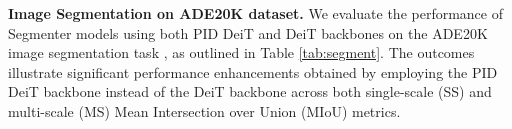 \textbf{Image Segmentation on ADE20K dataset.}
We evaluate the performance of Segmenter models \cite{strudel2021segmenter} using both PID DeiT and DeiT backbones on the ADE20K image segmentation task \cite{zhou2017scene}, as outlined in Table \ref{tab:segment}. The outcomes illustrate significant performance enhancements obtained by employing the PID DeiT backbone instead of the DeiT backbone across both single-scale (SS) and multi-scale (MS) Mean Intersection over Union (MIoU) metrics. 
\begin{table}[t!]
\vspace{-5mm}
\centering
\caption{\small 
\small 
Single-scale (SS) MIoU and multi-scale MIoU (MS) of the PID DeiT vs. the DeiT on the ADE20K image segmentation. 
}
    \color{black}
    \begin{center}
    \end{center}
\label{tab:segment}
\end{table}

